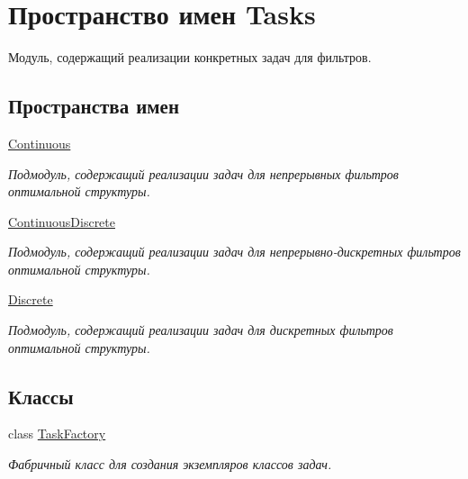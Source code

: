\hypertarget{namespace_tasks}{}\section{Пространство имен Tasks}
\label{namespace_tasks}


Модуль, содержащий реализации конкретных задач для фильтров.  


\subsection*{Пространства имен}
\begin{DoxyCompactItemize}
\item 
 \hyperlink{namespace_tasks_1_1_continuous}{Continuous}
\begin{DoxyCompactList}\small\item\em Подмодуль, содержащий реализации задач для непрерывных фильтров оптимальной структуры. \end{DoxyCompactList}\item 
 \hyperlink{namespace_tasks_1_1_continuous_discrete}{Continuous\+Discrete}
\begin{DoxyCompactList}\small\item\em Подмодуль, содержащий реализации задач для непрерывно-\/дискретных фильтров оптимальной структуры. \end{DoxyCompactList}\item 
 \hyperlink{namespace_tasks_1_1_discrete}{Discrete}
\begin{DoxyCompactList}\small\item\em Подмодуль, содержащий реализации задач для дискретных фильтров оптимальной структуры. \end{DoxyCompactList}\end{DoxyCompactItemize}
\subsection*{Классы}
\begin{DoxyCompactItemize}
\item 
class \hyperlink{class_tasks_1_1_task_factory}{Task\+Factory}
\begin{DoxyCompactList}\small\item\em Фабричный класс для создания экземпляров классов задач. \end{DoxyCompactList}\end{DoxyCompactItemize}
